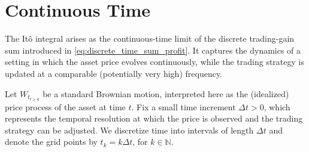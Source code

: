 \section{Continuous Time}
The Itô integral arises as the continuous-time limit of the discrete trading-gain sum introduced in \eqref{eq:discrete_time_sum_profit}. It captures the dynamics of a setting in which the asset price evolves continuously, while the trading strategy is updated at a comparable (potentially very high) frequency. 

Let $W_{t_{t \ge 0}}$ be a standard Brownian motion, interpreted here as the (idealized) price process of the asset at time $t$. Fix a small time increment $\Delta t > 0$, which represents the temporal resolution at which the price is observed and the trading strategy can be adjusted. We discretize time into intervals of length $\Delta t$ and denote the grid points by $t_k = k \Delta t$, for $k \in \mathbb{N}$. 

